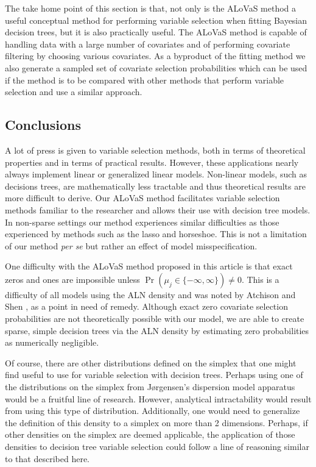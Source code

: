 		The take home point of this section is that, not only is the ALoVaS method a useful conceptual method for performing variable selection when fitting Bayesian decision trees, but it is also practically useful. The ALoVaS method is capable of handling data with a large number of covariates and of performing covariate filtering by choosing various covariates. As a byproduct of the fitting method we also generate a sampled set of covariate selection probabilities which can be used if the method is to be compared with other methods that perform variable selection and use a similar approach. 

\subsection{Conclusions}\label{sec:Conclusion}

A lot of press is given to variable selection methods, both in terms of theoretical properties and in terms of practical results. However, these applications nearly always implement linear or generalized linear models. Non-linear models, such as decisions trees, are mathematically less tractable and thus theoretical results are more difficult to derive. Our ALoVaS method facilitates variable selection methods familiar to the researcher and allows their use with decision tree models. In non-sparse settings our method experiences similar difficulties as those experienced by methods such as the lasso and horseshoe. This is not a limitation of our method \emph{per se} but rather an effect of model misspecification. 

One difficulty with the ALoVaS method proposed in this article is that exact zeros and ones are impossible unless $\Pr(\mu_j \in \{-\infty,\infty\})\neq 0$. This is a difficulty of all models using the ALN density and was noted by Atchison and Shen \cite{atchison1980logistic}, as a point in need of remedy. Although exact zero covariate selection probabilities are not theoretically possible with our model, we are able to create sparse, simple decision trees via the ALN density by estimating zero probabilities as numerically negligible. 

Of course, there are other distributions defined on the simplex that one might find useful to use for variable selection with decision trees. Perhaps using one of the distributions on the simplex from J\o rgensen's \cite{jorgensen1997theory} dispersion model apparatus would be a fruitful line of research. However, analytical intractability would result from using this type of distribution. Additionally, one would need to generalize the definition of this density to a simplex on more than 2 dimensions. Perhaps, if other densities on the simplex are deemed applicable, the application of those densities to decision tree variable selection could follow a line of reasoning similar to that described here. 

